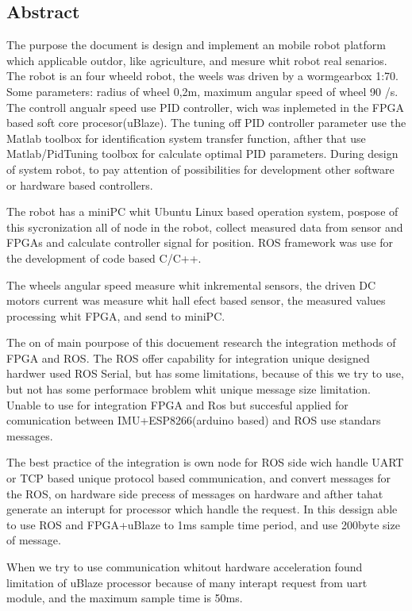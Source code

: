 \begin{titlepage}

\section*{Abstract}

The purpose the document is design and implement an mobile robot platform which applicable outdor, like agriculture, and mesure whit robot real senarios. The robot is an four wheeld robot, the weels was driven by a wormgearbox 1:70. Some parameters: radius of wheel 0,2m, maximum angular speed of wheel 90 \degree/s. The controll angualr speed use PID controller, wich was inplemeted in the FPGA based soft core procesor(uBlaze). The tuning off PID controller parameter use the Matlab toolbox for identification system transfer function, afther that use Matlab/PidTuning toolbox for calculate optimal PID parameters. During design of system robot, to pay attention of possibilities for development other software or hardware based controllers. 

The robot has a miniPC whit Ubuntu Linux based operation system, pospose of this sycronization all of node in the robot, collect measured data from sensor and FPGAs and calculate controller signal for position. ROS framework was use for the development of code based C/C++.

The wheels angular speed measure whit inkremental sensors, the driven DC motors current was measure whit hall efect based sensor, the measured values processing whit FPGA, and send to miniPC.

The on of main pourpose of this docuement research the integration methods of FPGA and ROS. The ROS offer capability for integration unique designed hardwer used ROS Serial, but has some limitations, because of this we try to use, but not has some performace broblem whit unique message size limitation. Unable to use for integration FPGA and Ros but succesful applied for comunication between IMU+ESP8266(arduino based) and ROS use standars messages.

The best practice of the integration is own node for ROS side wich handle UART or TCP based unique protocol based communication, and convert messages for the ROS, on hardware side precess of messages on hardware and afther tahat generate an interupt for processor which handle the request. In this dessign able to use ROS and FPGA+uBlaze to 1ms sample time period, and use 200byte size of message.

When we try to use communication whitout hardware acceleration found limitation of uBlaze processor because of many interapt request from uart module, and the maximum sample time is 50ms.


\end{titlepage}
